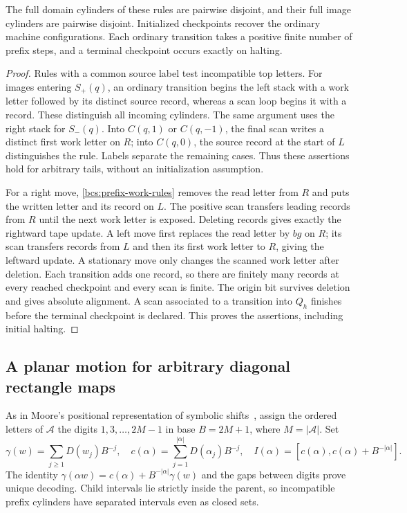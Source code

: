 \begin{lemma}\label{bcs:prefix-symbolic}
The full domain cylinders of these rules are pairwise disjoint, and their full image cylinders are pairwise disjoint. Initialized checkpoints recover the ordinary machine configurations. Each ordinary transition takes a positive finite number of prefix steps, and a terminal checkpoint occurs exactly on halting.
\end{lemma}
\begin{proof}
Rules with a common source label test incompatible top letters. For images entering $S_+(q)$, an ordinary transition begins the left stack with a work letter followed by its distinct source record, whereas a scan loop begins it with a record. These distinguish all incoming cylinders. The same argument uses the right stack for $S_-(q)$. Into $C(q,1)$ or $C(q,-1)$, the final scan writes a distinct first work letter on $R$; into $C(q,0)$, the source record at the start of $L$ distinguishes the rule. Labels separate the remaining cases. Thus these assertions hold for arbitrary tails, without an initialization assumption.

For a right move, \eqref{bcs:prefix-work-rules} removes the read letter from $R$ and puts the written letter and its record on $L$. The positive scan transfers leading records from $R$ until the next work letter is exposed. Deleting records gives exactly the rightward tape update. A left move first replaces the read letter by $bg$ on $R$; its scan transfers records from $L$ and then its first work letter to $R$, giving the leftward update. A stationary move only changes the scanned work letter after deletion. Each transition adds one record, so there are finitely many records at every reached checkpoint and every scan is finite. The origin bit survives deletion and gives absolute alignment. A scan associated to a transition into $Q_h$ finishes before the terminal checkpoint is declared. This proves the assertions, including initial halting.
\end{proof}

\subsection{A planar motion for arbitrary diagonal rectangle maps}
As in Moore's positional representation of symbolic shifts~\cite{Moore1991}, assign the ordered letters of $\mathcal A$ the digits $1,3,\ldots,2M-1$ in base $B=2M+1$, where $M=|\mathcal A|$. Set
\[
 \gamma(w)=\sum_{j\ge1}D(w_j)B^{-j},\quad
 c(\alpha)=\sum_{j=1}^{|\alpha|}D(\alpha_j)B^{-j},\quad
 I(\alpha)=[c(\alpha),c(\alpha)+B^{-|\alpha|}].
\]
The identity $\gamma(\alpha w)=c(\alpha)+B^{-|\alpha|}\gamma(w)$ and the gaps between digits prove unique decoding. Child intervals lie strictly inside the parent, so incompatible prefix cylinders have separated intervals even as closed sets.

